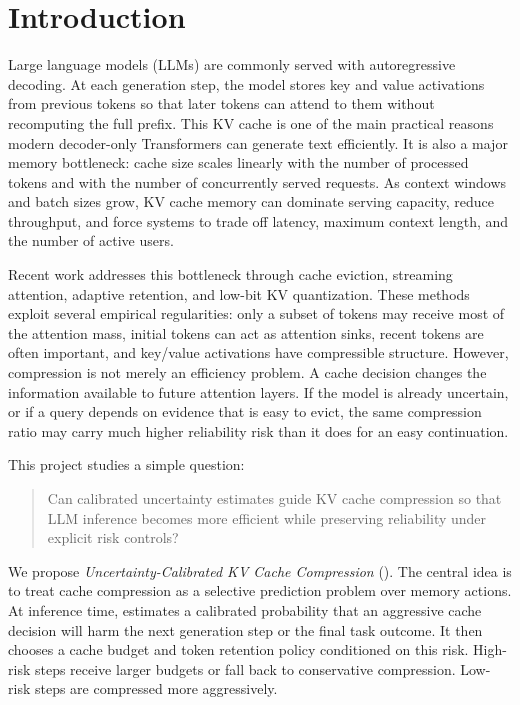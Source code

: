 \section{Introduction}

Large language models (LLMs) are commonly served with autoregressive decoding. At each generation step, the model stores key and value activations from previous tokens so that later tokens can attend to them without recomputing the full prefix. This KV cache is one of the main practical reasons modern decoder-only Transformers can generate text efficiently. It is also a major memory bottleneck: cache size scales linearly with the number of processed tokens and with the number of concurrently served requests. As context windows and batch sizes grow, KV cache memory can dominate serving capacity, reduce throughput, and force systems to trade off latency, maximum context length, and the number of active users.

Recent work addresses this bottleneck through cache eviction, streaming attention, adaptive retention, and low-bit KV quantization. These methods exploit several empirical regularities: only a subset of tokens may receive most of the attention mass, initial tokens can act as attention sinks, recent tokens are often important, and key/value activations have compressible structure. However, compression is not merely an efficiency problem. A cache decision changes the information available to future attention layers. If the model is already uncertain, or if a query depends on evidence that is easy to evict, the same compression ratio may carry much higher reliability risk than it does for an easy continuation.

This project studies a simple question:

\begin{quote}
Can calibrated uncertainty estimates guide KV cache compression so that LLM inference becomes more efficient while preserving reliability under explicit risk controls?
\end{quote}

We propose \emph{Uncertainty-Calibrated KV Cache Compression} (\uckv{}). The central idea is to treat cache compression as a selective prediction problem over memory actions. At inference time, \uckv{} estimates a calibrated probability that an aggressive cache decision will harm the next generation step or the final task outcome. It then chooses a cache budget and token retention policy conditioned on this risk. High-risk steps receive larger budgets or fall back to conservative compression. Low-risk steps are compressed more aggressively.

